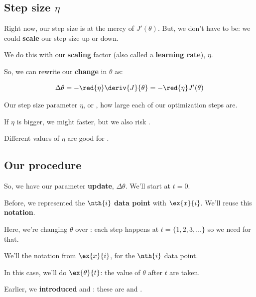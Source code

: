     \subsection{Step size $\eta$}
    
        Right now, our step size is at the mercy of $J'(\theta)$. But, we don't have to be: we could \textbf{scale} our step size up or down.
        
        We do this with our \textbf{scaling} factor (also called a \textbf{learning rate}), $\eta$.
        
        So, we can rewrite our \textbf{change} in $\theta$ as:
        
        \begin{equation}
            \Delta \theta
            = -\red{\eta}   \deriv{J}{\theta}
            = -\red{\eta}   J'(\theta)
        \end{equation}
        
        \begin{definition}
            Our step size parameter $\eta$, or ,  how large each of our optimization steps are.
            
            If $\eta$ is bigger, we might  faster, but we also risk .
            
            Different values of $\eta$ are good for .
        \end{definition}
        
    \subsection{Our procedure}
    
        So, we have our parameter \textbf{update}, $\Delta \theta$. We'll start at $t=0$.
        
        Before, we represented the $\nth{i}$ \textbf{data point} with $\ex{x}{i}$. We'll reuse this \textbf{notation}.\\
        
        \begin{notation}
            Here, we're changing $\theta$ over : each step happens at $t=\{1,2,3, \dots \}$ so we need  for that. 
            
            We'll  the notation from $\ex{x}{i}$, for the $\nth{i}$ data point.
            
            In this case, we'll do $\ex{\theta}{t}$: the value of $\theta$ after $t$  are taken.
            
            Earlier, we \textbf{introduced}  and : these are  and .
        \end{notation}
        
